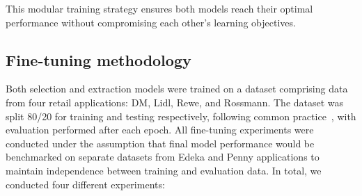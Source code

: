 \documentclass[licencjacka,en]{pracamgr}
\begin{document}
This modular training strategy ensures both models reach their optimal performance without compromising each other's learning objectives.
\subsection{Fine-tuning methodology} \label{FTMethodologyBert}
Both selection and extraction models were trained on a dataset comprising data from four retail applications: DM, Lidl, Rewe, and Rossmann. The dataset was split 80/20 for training and testing respectively, following common practice~\cite{pp}, with evaluation performed after each epoch. All fine-tuning experiments were conducted under the assumption that final model performance would be benchmarked on separate datasets from Edeka and Penny applications to maintain independence between training and evaluation data.
In total, we conducted four different experiments:
\end{document}
